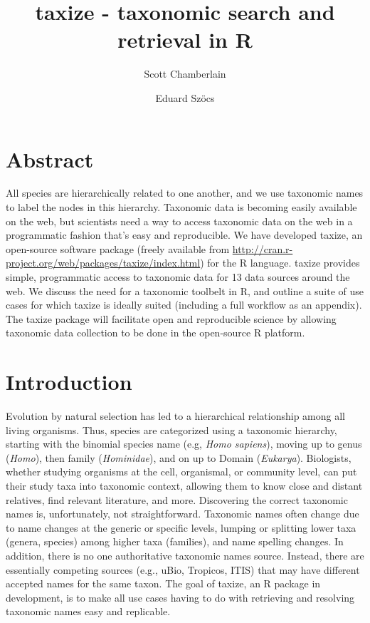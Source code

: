 \documentclass[letterpaper,superscriptaddress,showkeys,longbibliography,10pt]{revtex4-1}\usepackage{graphicx, color}
\begin{document}
\title{taxize - taxonomic search and retrieval in R}

\author{Scott Chamberlain}

\author{Eduard Sz\"{o}cs}

\maketitle

\section{Abstract}

All species are hierarchically related to one another, and we use taxonomic names to label the nodes in this hierarchy. Taxonomic data is becoming easily available on the web, but scientists need a way to access taxonomic data on the web in a programmatic fashion that's easy and reproducible. We have developed taxize, an open-source software package (freely available from \url{http://cran.r-project.org/web/packages/taxize/index.html}) for the R language. taxize provides simple, programmatic access to taxonomic data for 13 data sources around the web. We discuss the need for a taxonomic toolbelt in R, and outline a suite of use cases for which taxize is ideally suited (including a full workflow as an appendix). The taxize package will facilitate open and reproducible science by allowing taxonomic data collection to be done in the open-source R platform.

\section{Introduction}

Evolution by natural selection has led to a hierarchical relationship among all living organisms.  Thus, species are categorized using a taxonomic hierarchy, starting with the binomial species name (e.g, \emph{Homo sapiens}), moving up to genus (\emph{Homo}), then family (\emph{Hominidae}), and on up to Domain (\emph{Eukarya}). Biologists, whether studying organisms at the cell, organismal, or community level, can put their study taxa into taxonomic context, allowing them to know close and distant relatives, find relevant literature, and more. Discovering the correct taxonomic names is, unfortunately, not straightforward. Taxonomic names often change due to name changes at the generic or specific levels, lumping or splitting lower taxa (genera, species) among higher taxa (families), and name spelling changes. In addition, there is no one authoritative taxonomic names source. Instead, there are essentially competing sources (e.g., uBio, Tropicos, ITIS) that may have different accepted names for the same taxon. The goal of taxize, an R package in development, is to make all use cases having to do with retrieving and resolving taxonomic names easy and replicable. 
\end{document}
